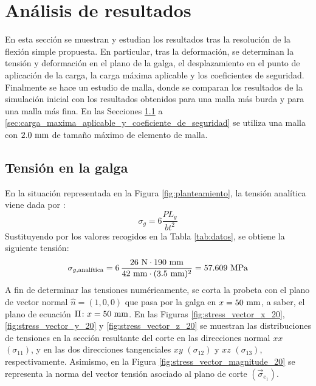 
\section{Análisis de resultados}

En esta sección se muestran y estudian los resultados tras la resolución de la flexión simple propuesta. En particular, tras la deformación, se determinan la tensión y deformación en el plano de la galga, el desplazamiento en el punto de aplicación de la carga, la carga máxima aplicable y los coeficientes de seguridad. Finalmente se hace un estudio de malla, donde se comparan los resultados de la simulación inicial con los resultados obtenidos para una malla más burda y para una malla más fina. En las Secciones \ref{sec:tension_en_la_galga} a \ref{sec:carga_maxima_aplicable_y_coeficiente_de_seguridad} se utiliza una malla con $2.0 \ \milli\meter$ de tamaño máximo de elemento de malla.

\subsection{Tensión en la galga} \label{sec:tension_en_la_galga}

En la situación representada en la Figura \ref{fig:planteamiento}, la tensión analítica viene dada por \cite{manualPractica1}:
\begin{equation} \label{eq:tension_analitica_galga}
    \sigma_{g} = 6 \frac{P L_g}{b t^2}
\end{equation}
Sustituyendo por los valores recogidos en la Tabla \ref{tab:datos}, se obtiene la siguiente tensión:
\[
    \sigma_{g,\text{analítica}} = 
    6 \, \frac{26 \ \newton \cdot 190 \ \milli\meter}{42 \ \milli\meter \cdot (3.5 \ \milli\meter)^2} = 
    57.609 \ \mega\pascal
\]
A fin de determinar las tensiones numéricamente, se corta la probeta con el plano de vector normal $\hat{n} = (1, 0, 0)$ que pasa por la galga en $x = 50 \ \milli\meter$, a saber, el plano de ecuación $\Pi \colon x = 50 \ \milli\meter$. En las Figuras \ref{fig:stress_vector_x_20}, \ref{fig:stress_vector_y_20} y \ref{fig:stress_vector_z_20} se muestran las distribuciones de tensiones en la sección resultante del corte en las direcciones normal $xx$ $(\sigma_{11})$, y en las dos direcciones tangenciales $xy$ $(\sigma_{12})$ y $xz$ $(\sigma_{13})$, respectivamente. Asimismo, en la Figura \ref{fig:stress_vector_magnitude_20} se representa la norma del vector tensión asociado al plano de corte $(\vec{\sigma}_{e_1})$.

